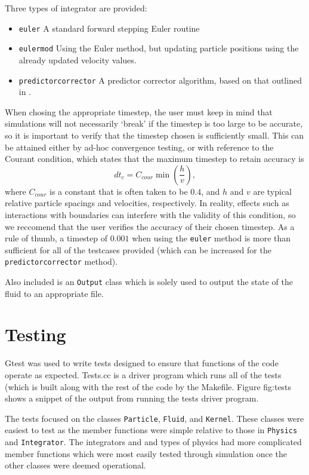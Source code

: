 \documentclass[11pt]{article}
\begin{document}
Three types of integrator are provided:
\begin{itemize}
\item \texttt{euler} A standard forward stepping Euler routine
\item \texttt{eulermod} Using the Euler method, but updating particle positions using the already
updated velocity values.
\item \texttt{predictorcorrector} A predictor corrector algorithm, based on that outlined in \cite{Price04}.
\end{itemize}
When chosing the appropriate timestep, the user must keep in mind that simulations will not necessarily `break' if the timestep is too large to be accurate, so it is important to verify that the timestep chosen is sufficiently small. This can be attained either by ad-hoc convergence testing, or with reference to the Courant condition, which states that the maximum timestep to retain accuracy is  \cite{Price04}
$$ dt_c = C_{cour} \min\left(\frac{h}{v}\right),$$
where $C_{cour}$ is a constant that is often taken to be  $0.4$, and $h$ and $v$ are typical relative particle spacings and velocities, respectively. In reality, effects such as interactions with boundaries can interfere with the validity of this condition, so we reccomend that the user verifies the accuracy of their chosen timestep. As a rule of thumb, a timestep of $0.001$ when using the \texttt{euler} method is more than sufficient for all of the testcases provided (which can be increased for the \texttt{predictorcorrector} method). 



Also included is an \texttt{Output} class which is solely used to output the
state of the fluid to an appropriate file.


\section{Testing}

Gtest was used to write tests designed to ensure that functions of the code operate as expected. Tests.cc is a driver program which runs all of the tests (which is built along with the rest of the code by the Makefile. Figure {fig:tests} shows a snippet of the output from running the tests driver program.

The tests focused on the classes \texttt{Particle}, \texttt{Fluid}, and 
\texttt{Kernel}. These classes were easiest to test as the member functions 
were simple relative to those in \texttt{Physics} and \texttt{Integrator}. The 
integrators and and types of physics had more complicated member functions
which were most easily tested through simulation once the other classes were
deemed operational. 
\end{document}
